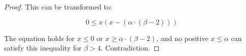 \documentclass[9pt,twocolumn]{scrartcl}
\newcommand{\variab}{\nu}
\newcommand{\aroot}{\emph{root}}
\newcommand{\clauses}{\alpha}
\newcommand{\variables}{\beta}
\newcommand{\FP}{\textsc{FP}}
\newcommand{\RS}{\textsc{RS}}
\newcommand{\BW}{\textsc{BW}}
\newcommand{\Tree}{\ensuremath{T}}
\newcommand{\Vms}{\ensuremath{n_V}}
\newcommand{\SAT}{\textsc{Sat}}
\newcommand{\Formula}{\ensuremath{\Psi}}
\newcommand{\Thr}{\ensuremath{Th}}
\newcommand{\positive}{\ensuremath{positive}}
\newcommand{\negative}{\ensuremath{negative}}
\begin{document}
\begin{appendix}
\begin{proof}
This can be transformed to:

$$ 0 \leq x(x - (\clauses \cdot (\variables - 2))) $$

The equation holds for $x \leq 0$ or $x \geq \clauses \cdot (\variables - 2)$,
and no
positive $x \leq \clauses$ can satisfy this inequality for $\variables > 4$. Contradiction.
\end{proof}

\end{appendix}
\end{document}
